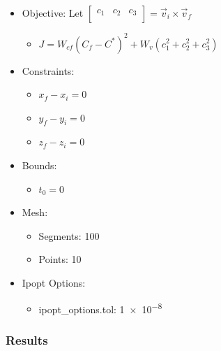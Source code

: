 \documentclass{article}
\begin{document}
\begin{itemize}
    \item Objective: Let $\left[\begin{matrix}c_1&c_2&c_3\\\end{matrix}\right] = \vec{v}_i\times\vec{v}_f$
    \begin{itemize}
        \item $J = W_{cf}\left(C_f - C^*\right)^2 + W_v\left(c_1^2 + c_2^2 + c_3^2\right)$
    \end{itemize}
    \item Constraints: 
    \begin{itemize}
        \item $x_f - x_i = 0$
        \item $y_f - y_i = 0$
        \item $z_f - z_i = 0$
    \end{itemize}
    \item Bounds:
    \begin{itemize}
        \item $t_0 = 0$
    \end{itemize}
    \item Mesh:
    \begin{itemize}
        \item Segments: 100
        \item Points: 10
    \end{itemize}
    \item Ipopt Options:
    \begin{itemize}
        \item ipopt\_options.tol: \num{1e-8}
    \end{itemize}
\end{itemize}

\subsubsection{Results}
\end{document}
